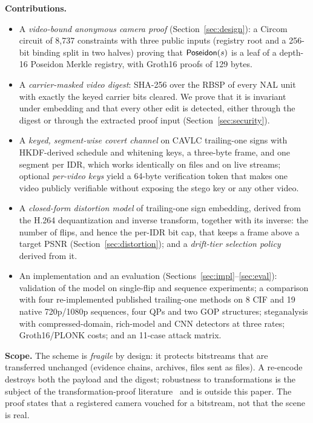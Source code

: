 \textbf{Contributions.}
\begin{itemize}
\item A \emph{video-bound anonymous camera proof} (Section~\ref{sec:design}): a Circom circuit of 8{,}737 constraints with three public inputs (registry root and a 256-bit binding split in two halves) proving that $\mathsf{Poseidon}(s)$ is a leaf of a depth-16 Poseidon Merkle registry, with Groth16 proofs of 129 bytes.
\item A \emph{carrier-masked video digest}: SHA-256 over the RBSP of every NAL unit with exactly the keyed carrier bits cleared. We prove that it is invariant under embedding and that every other edit is detected, either through the digest or through the extracted proof input (Section~\ref{sec:security}).
\item A \emph{keyed, segment-wise covert channel} on CAVLC trailing-one signs with HKDF-derived schedule and whitening keys, a three-byte frame, and one segment per IDR, which works identically on files and on live streams; optional \emph{per-video keys} yield a 64-byte verification token that makes one video publicly verifiable without exposing the stego key or any other video.
\item A \emph{closed-form distortion model} of trailing-one sign embedding, derived from the H.264 dequantization and inverse transform, together with its inverse: the number of flips, and hence the per-IDR bit cap, that keeps a frame above a target PSNR (Section~\ref{sec:distortion}); and a \emph{drift-tier selection policy} derived from it.
\item An implementation and an evaluation (Sections~\ref{sec:impl}--\ref{sec:eval}): validation of the model on single-flip and sequence experiments; a comparison with four re-implemented published trailing-one methods on 8 CIF and 19 native 720p/1080p sequences, four QPs and two GOP structures; steganalysis with compressed-domain, rich-model and CNN detectors at three rates; Groth16/PLONK costs; and an 11-case attack matrix.
\end{itemize}

\textbf{Scope.} The scheme is \emph{fragile} by design: it protects bitstreams that are transferred unchanged (evidence chains, archives, files sent as files). A re-encode destroys both the payload and the digest; robustness to transformations is the subject of the transformation-proof literature~\cite{photoproof2016,veritas2024,zkcinema2026} and is outside this paper. The proof states that a registered camera vouched for a bitstream, not that the scene is real.
